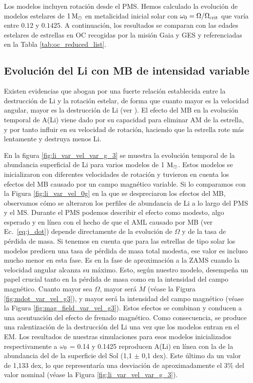 Los modelos incluyen rotación desde el PMS. Hemos calculado la evolución de modelos estelares de $1\,\mathrm{M}_\odot$ en metalicidad inicial solar con $\omega_{\mathrm{0}} = \Omega / \Omega_{\mathrm{crit}}$ que varía entre $0.12$ y $0.1425$. A continuación, los resultados se comparan con las edades estelares de estrellas en OC recogidas por la misión Gaia y GES y referenciadas en la Tabla \ref{tab:oc_reduced_list}.\par

\subsection{Evolución del Li con MB de intensidad variable}
Existen evidencias que abogan por una fuerte relación establecida entre la destrucción de Li y la rotación estelar, de forma que cuanto mayor es la velocidad angular, mayor es la destrucción de Li (ver \cite{Bouvier2018, Caballero2020}). El efecto del MB en la evolución temporal de A(Li) viene dado por su capacidad para eliminar AM de la estrella, y por tanto influir en su velocidad de rotación, haciendo que la estrella rote más lentamente y destruya menos Li.\par

En la figura \ref{fig:li_var_vel_var_g_3} se muestra la evolución temporal de la abundancia superficial de Li para varios modelos de 1 $\mathrm{M}_\odot$. Estos modelos se inicializaron con diferentes velocidades de rotación y tuvieron en cuenta los efectos del MB causado por un campo magnético variable. Si lo comparamos con la Figura \ref{fig:li_var_vel_0g} en la que se despreciaron los efectos del MB, observamos cómo se alteraron los perfiles de abundancia de Li a lo largo del PMS y el MS. Durante el PMS podemos describir el efecto como modesto, algo esperado y en línea con el hecho de que el AML causado por MB (ver Ec.~\ref{eq:j_dot}) depende directamente de la evolución de $\Omega$ y de la tasa de pérdida de masa. Si tenemos en cuenta que para las estrellas de tipo solar los modelos predicen una tasa de pérdida de masa total modesta, ese valor es incluso mucho menor en esta fase. Es en la fase de aproximación a la ZAMS cuando la velocidad angular alcanza su máximo. Esto, según nuestro modelo, desempeña un papel crucial tanto en la pérdida de masa como en la intensidad del campo magnético. Cuanto mayor sea $\Omega$, mayor será $\Dot{M}$ (véase la Figura \ref{fig:mdot_var_vel_g3}), y mayor será la intensidad del campo magnético (véase la Figura \ref{fig:mag_field_var_vel_g3}). Estos efectos se combinan y conducen a una acentuación del efecto de frenado magnético. Como consecuencia, se produce una ralentización de la destrucción del Li una vez que los modelos entran en el EM. Los resultados de nuestras simulaciones para esos modelos inicializados respectivamente a $\omega_{\mathrm{0}}$ = 0.14 y 0.1425 reproducen A(Li) en línea con la de la abundancia del  de la superficie del Sol (1,1 $\pm$ 0,1 dex). Este último da un valor de 1,133 dex, lo que representaría una desviación de aproximadamente el 3\% del valor nominal (véase la Figura \ref{fig:li_var_vel_var_g_3}).\par

